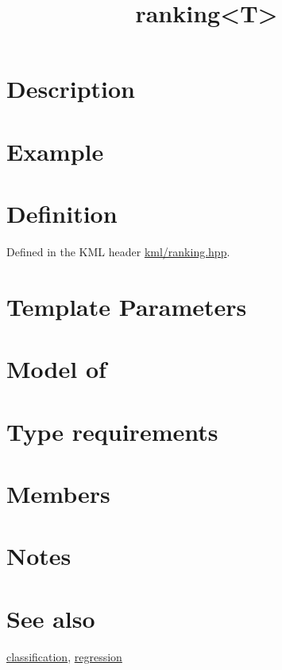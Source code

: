 \documentclass{article}
\begin{document}
\title{ranking<T>}
\maketitle

\section*{Description}
\section*{Example}
\section*{Definition}

Defined in the KML header \href{\kmlsvnroot/kml/ranking.hpp}{kml/ranking.hpp}.

\section*{Template Parameters}
\section*{Model of}
\section*{Type requirements}
\section*{Members}
\section*{Notes}
\section*{See also}

\href{\kmlroot/reference/classification.html}{classification},
\href{\kmlroot/reference/regression.html}{regression}



\end{document}
